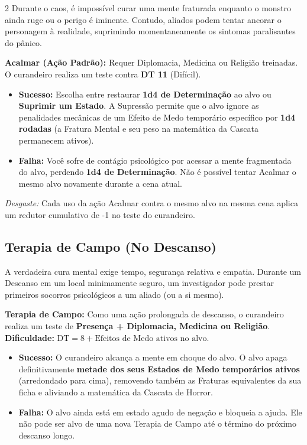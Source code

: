 \documentclass[a4paper,11pt,openany]{book}
\begin{document}
\begin{multicols}{2}
Durante o caos, é impossível curar uma mente fraturada enquanto o monstro ainda ruge ou o perigo é iminente. Contudo, aliados podem tentar ancorar o personagem à realidade, suprimindo momentaneamente os sintomas paralisantes do pânico.

\begin{regra}
\textbf{Acalmar (Ação Padrão):} Requer Diplomacia, Medicina ou Religião treinadas. O curandeiro realiza um teste contra \textbf{DT 11} (Difícil).
\end{regra}

\begin{itemize}
    \item \textbf{Sucesso:} Escolha entre restaurar \textbf{1d4 de Determinação} ao alvo ou \textbf{Suprimir um Estado}. A Supressão permite que o alvo ignore as penalidades mecânicas de um Efeito de Medo temporário específico por \textbf{1d4 rodadas} (a Fratura Mental e seu peso na matemática da Cascata permanecem ativos).
    \item \textbf{Falha:} Você sofre de contágio psicológico por acessar a mente fragmentada do alvo, perdendo \textbf{1d4 de Determinação}. Não é possível tentar Acalmar o mesmo alvo novamente durante a cena atual.
\end{itemize}

\textit{Desgaste:} Cada uso da ação Acalmar contra o mesmo alvo na mesma cena aplica um redutor cumulativo de -1 no teste do curandeiro.

\subsection{Terapia de Campo (No Descanso)}

A verdadeira cura mental exige tempo, segurança relativa e empatia. Durante um Descanso em um local minimamente seguro, um investigador pode prestar primeiros socorros psicológicos a um aliado (ou a si mesmo).

\begin{regra}
\textbf{Terapia de Campo:} Como uma ação prolongada de descanso, o curandeiro realiza um teste de \textbf{Presença + Diplomacia, Medicina ou Religião}. \\
\textbf{Dificuldade:} $\text{DT} = 8 + \text{Efeitos de Medo ativos no alvo}$.
\end{regra}

\begin{itemize}
    \item \textbf{Sucesso:} O curandeiro alcança a mente em choque do alvo. O alvo apaga definitivamente \textbf{metade dos seus Estados de Medo temporários ativos} (arredondado para cima), removendo também as Fraturas equivalentes da sua ficha e aliviando a matemática da Cascata de Horror.
    \item \textbf{Falha:} O alvo ainda está em estado agudo de negação e bloqueia a ajuda. Ele não pode ser alvo de uma nova Terapia de Campo até o término do próximo descanso longo.
\end{itemize}


\end{multicols}
\end{document}
